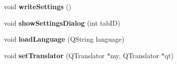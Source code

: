 \begin{DoxyCompactItemize}
\item 
\hypertarget{classMainWindow_a49be45fc9b993fdc3afe55d4b6fa0650}{
void {\bfseries writeSettings} ()}
\label{classMainWindow_a49be45fc9b993fdc3afe55d4b6fa0650}

\item 
\hypertarget{classMainWindow_a7059d33161e3004eeb67831af59764d3}{
void {\bfseries showSettingsDialog} (int tabID)}
\label{classMainWindow_a7059d33161e3004eeb67831af59764d3}

\item 
\hypertarget{classMainWindow_a7e23764f34b4f77bff2e668d3af32585}{
void {\bfseries loadLanguage} (QString language)}
\label{classMainWindow_a7e23764f34b4f77bff2e668d3af32585}

\item 
\hypertarget{classMainWindow_a36c558b2a34c0bb56ae8a60c5bcfdff0}{
void {\bfseries setTranslator} (QTranslator $\ast$my, QTranslator $\ast$qt)}
\label{classMainWindow_a36c558b2a34c0bb56ae8a60c5bcfdff0}

\end{DoxyCompactItemize}
